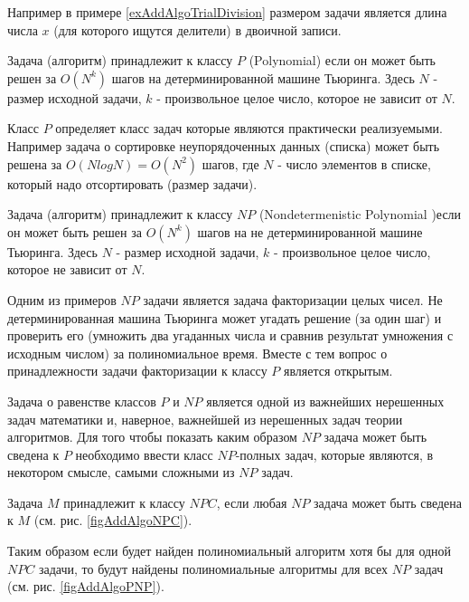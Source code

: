 Например в примере \ref{exAddAlgoTrialDivision} размером задачи
является длина числа $x$ (для которого ищутся делители) в двоичной
записи. 

\begin{definition}[Класс $P$]
Задача (алгоритм) принадлежит к классу $P$ (Polynomial) если он может
быть решен за 
 $O\left(N^k\right)$ шагов на детерминированной машине Тьюринга.
Здесь $N$ - размер исходной задачи, $k$ - произвольное целое число,
которое не зависит от $N$.  
\end{definition}

Класс $P$ определяет класс задач которые являются практически
реализуемыми. Например задача о сортировке неупорядоченных данных
(списка) может быть решена за 
$O\left(N log N \right) = O\left(N^2\right)$ шагов, где $N$ - число
элементов в списке, который надо отсортировать (размер задачи).

\begin{definition}[Класс $NP$]
Задача (алгоритм) принадлежит к классу $NP$ (Nondetermenistic Polynomial )если
он может быть решен за  $O\left(N^k\right)$ шагов на
не детерминированной машине Тьюринга.  Здесь $N$ - размер исходной
задачи, $k$ - произвольное целое число, которое не зависит от $N$. 
\end{definition}

Одним из примеров $NP$ задачи является задача факторизации целых
чисел. Не детерминированная машина Тьюринга может угадать решение (за
один шаг) и проверить его (умножить два угаданных числа и сравнив
результат умножения с исходным числом) за полиномиальное время. Вместе
с тем вопрос о принадлежности задачи факторизации к классу $P$
является открытым. 



Задача о равенстве классов $P$ и $NP$ является одной из важнейших
нерешенных задач математики и, наверное, важнейшей из нерешенных задач
теории алгоритмов. Для того чтобы показать каким образом $NP$ задача
может быть сведена к  $P$ необходимо ввести класс $NP$-полных задач,
которые являются, в некотором смысле, самыми сложными из $NP$ задач. 

\begin{definition}
Задача $M$ принадлежит к классу $NPC$, если любая $NP$ задача
может быть сведена к $M$ (см. рис. \ref{figAddAlgoNPC}).
\end{definition}



Таким образом если будет найден полиномиальный алгоритм хотя бы для
одной $NPC$ задачи, то будут найдены полиномиальные алгоритмы
для всех $NP$ задач (см. рис. \ref{figAddAlgoPNP}). 
 


